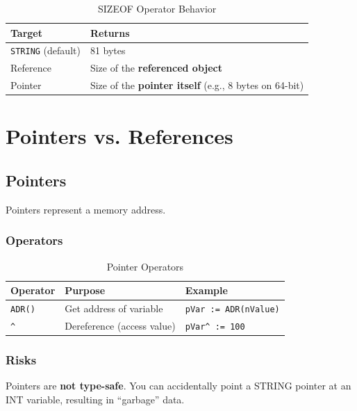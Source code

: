 \documentclass[11pt,a4paper]{article}
\begin{document}
\begin{table}[h]
\centering
\begin{tabular}{@{}ll@{}}
\toprule
\textbf{Target} & \textbf{Returns} \\
\midrule
\texttt{STRING} (default) & 81 bytes \\
Reference & Size of the \textbf{referenced object} \\
Pointer & Size of the \textbf{pointer itself} (e.g., 8 bytes on 64-bit) \\
\bottomrule
\end{tabular}
\caption{SIZEOF Operator Behavior}
\end{table}

\section{Pointers vs. References}

\subsection{Pointers}

Pointers represent a memory address.

\subsubsection{Operators}

\begin{table}[h]
\centering
\begin{tabular}{@{}lll@{}}
\toprule
\textbf{Operator} & \textbf{Purpose} & \textbf{Example} \\
\midrule
\texttt{ADR()} & Get address of variable & \texttt{pVar := ADR(nValue)} \\
\texttt{\^{}} & Dereference (access value) & \texttt{pVar\^{} := 100} \\
\bottomrule
\end{tabular}
\caption{Pointer Operators}
\end{table}

\subsubsection{Risks}

\begin{warningbox}
Pointers are \textbf{not type-safe}. You can accidentally point a STRING pointer at an INT variable, resulting in ``garbage'' data.
\end{warningbox}
\end{document}
